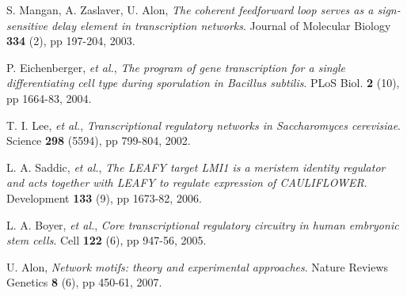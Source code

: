 \begin{thebibliography}{99}
  S. Mangan, A. Zaslaver, U. Alon,
  \emph{The coherent feedforward loop serves as a sign-sensitive delay element in transcription networks}.
  Journal of Molecular Biology \textbf{334} (2), pp 197-204,
  2003.

  P. Eichenberger, \textit{et al.},
  \emph{The program of gene transcription for a single differentiating cell type during sporulation in Bacillus subtilis}.
  PLoS Biol. \textbf{2} (10), pp 1664-83,
  2004.

  T. I. Lee, \textit{et al.},
  \emph{Transcriptional regulatory networks in Saccharomyces cerevisiae}.
  Science \textbf{298} (5594), pp 799-804,
  2002.

  L. A. Saddic, \textit{et al.},
  \emph{The LEAFY target LMI1 is a meristem identity regulator and acts together with LEAFY to regulate expression of CAULIFLOWER}.
  Development \textbf{133} (9), pp 1673-82,
  2006.

  L. A. Boyer, \textit{et al.},
  \emph{Core transcriptional regulatory circuitry in human embryonic stem cells}.
  Cell \textbf{122} (6), pp 947-56,
  2005.

  U. Alon,
  \emph{Network motifs: theory and experimental approaches}.
  Nature Reviews Genetics \textbf{8} (6), pp 450-61,
  2007.

\end{thebibliography}
